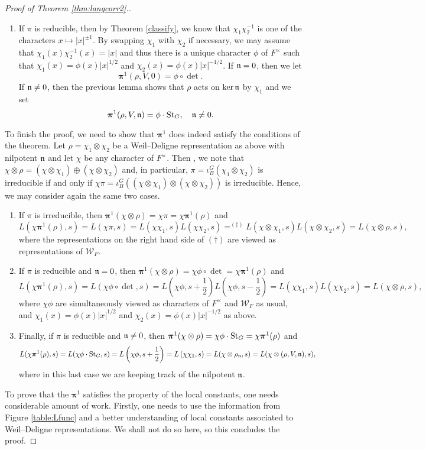 \begin{proof}[Proof of Theorem \ref{thm:langcorr2}.]
\begin{enumerate}[(1)]
        \item If $\pi$ is reducible, then by Theorem \ref{classify}, we know that $\chi_1\chi_2^{-1}$ is one of the characters $x\mapsto|x|^{\pm1}$. By swapping $\chi_1$ with $\chi_2$ if necessary, we may assume that $\chi_1(x)\chi_2^{-1}(x)=|x|$ and thus there is a unique character $\phi$ of $F^\times$ such that $\chi_1(x)=\phi(x)|x|^{1/2}$ and $\chi_2(x)=\phi(x)|x|^{-1/2}$. If $\mathfrak{n}=0$, then we let 
        $$\bm\pi^1(\rho,V,0)=\phi\circ\det.$$
        If $\mathfrak{n}\neq0$, then the previous lemma shows that $\rho$ acts on $\ker\mathfrak{n}$ by $\chi_1$ and we set 
        $$\bm\pi^1(\rho,V,\mathfrak{n})=\phi\cdot\mathrm{St}_G,\quad \mathfrak{n}\neq0.$$
    \end{enumerate}
    To finish the proof, we need to show that $\bm\pi^1$ does indeed satisfy the conditions of the theorem. Let $\rho=\chi_1\otimes\chi_2$ be a Weil--Deligne representation as above with nilpotent $\mathfrak{n}$ and let $\chi$ be any character of $F^\times$. Then , we note that $\chi\otimes\rho=(\chi\otimes\chi_1)\oplus(\chi\otimes\chi_2)$ and, in particular, $\pi=\iota_B^G(\chi_1\otimes\chi_2)$ is irreducible if and only if $\chi\pi=\iota_B^G((\chi\otimes\chi_1)\otimes(\chi\otimes\chi_2))$ is irreducible. Hence, we may consider again the same two cases.
    \begin{enumerate}[(1)]
        \item If $\pi$ is irreducible, then $\bm\pi^1(\chi\otimes\rho)=\chi\pi=\chi\bm\pi^1(\rho)$ and
        $$L(\chi\bm\pi^1(\rho),s)=L(\chi\pi,s)=L(\chi\chi_1,s)L(\chi\chi_2,s)=^{(\dagger)}L(\chi\otimes\chi_1,s)L(\chi\otimes\chi_2,s)=L(\chi\otimes\rho,s),$$
        where the representations on the right hand side of $(\dagger)$ are viewed as representations of $\mathcal{W}_F$.
        \item If $\pi$ is reducible and $\mathfrak{n}=0$, then $\bm\pi^1(\chi\otimes\rho)=\chi\phi\circ\det=\chi\bm\pi^1(\rho)$ and
        $$L(\chi\bm\pi^1(\rho),s)=L(\chi\phi\circ\det,s)=L\left(\chi\phi,s+\frac{1}{2}\right)L\left(\chi\phi,s-\frac{1}{2}\right)=L\left(\chi\chi_1,s\right)L\left(\chi\chi_2,s\right)=L(\chi\otimes\rho,s),$$
        where $\chi\phi$ are simultaneously viewed as characters of $F^\times$ and $\mathcal{W}_F$ as usual, and $\chi_1(x)=\phi(x)|x|^{1/2}$ and $\chi_2(x)=\phi(x)|x|^{-1/2}$ as above.
        \item Finally, if $\pi$ is reducible and $\mathfrak{n}\neq0$, then $\bm\pi^1(\chi\otimes\rho)=\chi\phi\cdot\mathrm{St}_G=\chi\bm\pi^1(\rho)$ and
        $$L(\chi\bm\pi^1(\rho),s)=L(\chi\phi\cdot\mathrm{St}_G,s)=L\left(\chi\phi,s+\frac{1}{2}\right)=L\left(\chi\chi_1,s\right)=L(\chi\otimes\rho_{\mathfrak{n}},s)=L(\chi\otimes(\rho,V,\mathfrak{n}),s),$$
        where in this last case we are keeping track of the nilpotent $\mathfrak{n}$.
    \end{enumerate}
    To prove that the $\bm\pi^1$ satisfies the property of the local constants, one needs considerable amount of work. Firstly, one needs to use the information from Figure \ref{table:Lfunc} and a better understanding of local constants associated to Weil--Deligne representations. We shall not do so here, so this concludes the proof.
\end{proof}








\newpage